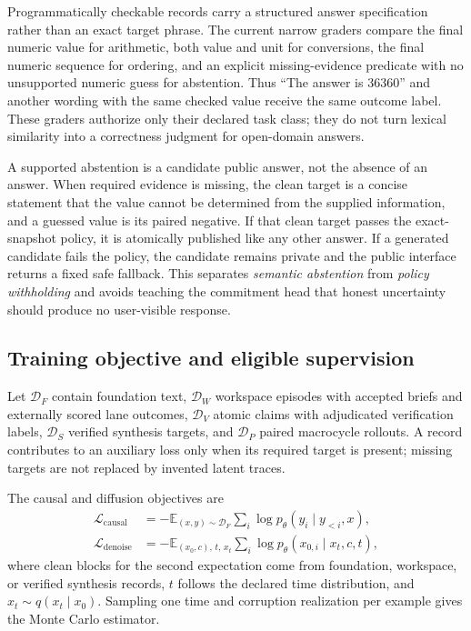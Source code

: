 \documentclass[10pt,a4paper]{article}
\newcommand{\Lcal}{\mathcal{L}}
\newcommand{\Dcal}{\mathcal{D}}
\newcommand{\E}{\mathbb{E}}
\begin{document}
Programmatically checkable records carry a structured answer specification
rather than an exact target phrase. The current narrow graders compare the
final numeric value for arithmetic, both value and unit for conversions, the
final numeric sequence for ordering, and an explicit missing-evidence
predicate with no unsupported numeric guess for abstention. Thus ``The answer
is 36360'' and another wording with the same checked value receive the same
outcome label. These graders authorize only their declared task class; they do
not turn lexical similarity into a correctness judgment for open-domain
answers.

A supported abstention is a candidate public answer, not the absence of an
answer. When required evidence is missing, the clean target is a concise
statement that the value cannot be determined from the supplied information,
and a guessed value is its paired negative. If that clean target passes the
exact-snapshot policy, it is atomically published like any other answer. If a
generated candidate fails the policy, the candidate remains private and the
public interface returns a fixed safe fallback. This separates \emph{semantic
abstention} from \emph{policy withholding} and avoids teaching the commitment
head that honest uncertainty should produce no user-visible response.

\subsection{Training objective and eligible supervision}

Let $\Dcal_F$ contain foundation text, $\Dcal_W$ workspace episodes with
accepted briefs and externally scored lane outcomes, $\Dcal_V$ atomic claims
with adjudicated verification labels, $\Dcal_S$ verified synthesis targets,
and $\Dcal_P$ paired macrocycle rollouts. A record contributes to an auxiliary
loss only when its required target is present; missing targets are not
replaced by invented latent traces.

The causal and diffusion objectives are
\begin{align}
\Lcal_{\mathrm{causal}} &= -\E_{(x,y) \sim \Dcal_F}
  \sum_i \log p_\theta( y_i \mid y_{<i}, x ), \\
\Lcal_{\mathrm{denoise}} &= -\E_{(x_0,c),\, t,\, x_t}
  \sum_i \log p_\theta( x_{0,i} \mid x_t, c, t ),
\end{align}
where clean blocks for the second expectation come from foundation, workspace,
or verified synthesis records, $t$ follows the declared time distribution, and
$x_t \sim q(x_t \mid x_0)$. Sampling one time and corruption realization per
example gives the Monte Carlo estimator.
\end{document}

